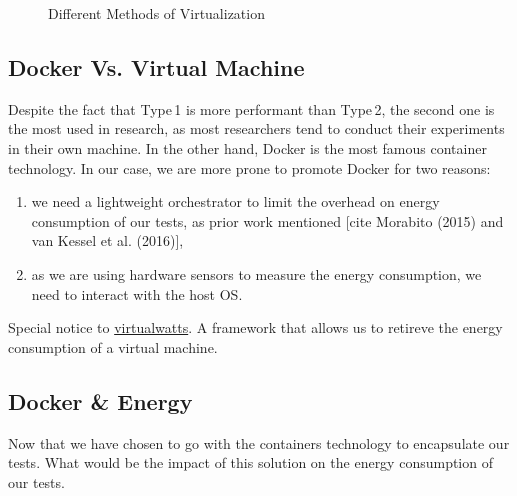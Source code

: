 \begin{figure}
    \caption{Different Methods of Virtualization}\label{environement:virtualization_technique}
\end{figure}


\subsection{Docker Vs. Virtual Machine}
Despite the fact that \textsf{Type\,1} is more performant than \textsf{Type\,2}, the second one is the most used in research, as most researchers tend to conduct their experiments in their own machine.
In the other hand, Docker is the most famous container technology.
In our case, we are more prone to promote Docker for two reasons:
\begin{enumerate}
    \item we need a lightweight orchestrator to limit the overhead on energy consumption of our tests, as prior work mentioned
    \cite{van2016power}
    [cite Morabito (2015) and van Kessel et al. (2016)],
    \item as we are using hardware sensors to measure the energy consumption, we need to interact with the host OS.
\end{enumerate}

Special notice to \href{https://github.com/powerapi-ng/virtualwatts}{virtualwatts}. A framework that allows us to retireve the energy consumption of a virtual machine.


\subsection{Docker \& Energy}
Now that we have chosen to go with the containers technology to encapsulate our tests.
What would be the impact of this solution on the energy consumption of our tests.

